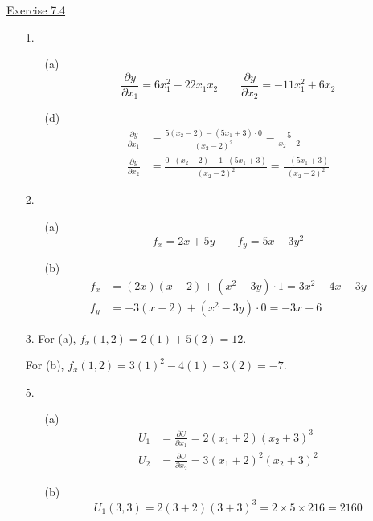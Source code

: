 \underline{Exercise 7.4}
\begin{enumerate}
\item[1.]
\begin{enumerate}
\item[(a)] 
\[\frac{\partial y}{\partial x_{1}}=6x_{1}^{2}-22x_{1}x_{2} \qquad \frac{\partial y}{\partial x_{2}}=-11x_{1}^{2}+6x_{2}\]

\item[(d)] 
\[\begin{aligned}
\frac{\partial y}{\partial x_{1}} &= \frac{5\left(x_{2}-2\right)-\left(5x_{1}+3\right)\cdot 0}{\left(x_{2}-2\right)^{2}}=\frac{5}{x_{2}-2} \\
\frac{\partial y}{\partial x_{2}} &= \frac{0\cdot\left(x_{2}-2\right)-1\cdot\left(5x_{1}+3\right)}{\left(x_{2}-2\right)^{2}}=\frac{-\left(5x_{1}+3\right)}{\left(x_{2}-2\right)^{2}}
\end{aligned}\]

\end{enumerate}

\item[2.]
\begin{enumerate}
\item[(a)] 
\[f_{x}=2x+5y \qquad f_{y}=5x-3y^{2}\]

\item[(b)] 
\[\begin{aligned}
f_{x} &= (2x)(x-2)+\left(x^{2}-3y\right)\cdot 1=3x^{2}-4x-3y \\
f_{y} &= -3(x-2)+\left(x^{2}-3y\right)\cdot 0=-3x+6
\end{aligned}\]

\end{enumerate}

\item[3.] For (a), $f_{x}(1,2)=2(1)+5(2)=12$.

For (b), $f_{x}(1,2)=3(1)^{2}-4(1)-3(2)=-7$.

\item[5.]
\begin{enumerate}
\item[(a)] 
\[\begin{aligned}
U_{1} &= \frac{\partial U}{\partial x_{1}}=2\left(x_{1}+2\right)\left(x_{2}+3\right)^{3} \\
U_{2} &= \frac{\partial U}{\partial x_{2}}=3\left(x_{1}+2\right)^{2}\left(x_{2}+3\right)^{2}
\end{aligned}\]

\item[(b)] 
\[U_{1}(3,3)=2(3+2)(3+3)^{3}=2\times 5\times 216=2160\]


\end{enumerate}
\end{enumerate}
